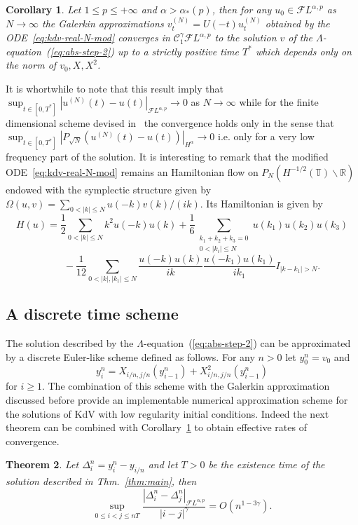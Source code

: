 \documentclass[a4paper,11pt,reqno]{article}
\newcommand{\RR}{\mathbb{R}}
\newcommand{\TT}{\mathbb{T}}
\newcommand{\CC}{\mathcal{C}}
\newcommand{\FF}{\mathcal{F}}
\newtheorem{theorem}{Theorem}
\newtheorem{corollary}[theorem]{Corollary}
\begin{document}
\begin{corollary}
\label{cor:galerkin} Let $1 \le p \le +\infty$ and $\alpha > \alpha_*(p)$, then for any $u_0 \in \FF L^{\alpha,p}$
as $N \to \infty$ the Galerkin approximations $v^{(N)}_t = U(-t) u^{(N)}_t$ obtained by the ODE~\eqref{eq:kdv-real-N-mod}  converges in $\CC_1^\gamma  \FF L^{\alpha,p}$ to
the solution $v$ of the $\Lambda$-equation~(\ref{eq:abs-step-2}) up to
a strictly positive time $T^*$ which depends only on the norm of
$v_0,X,X^2$.  
\end{corollary}
%
It is whortwhile to note that this result imply that
$
\sup_{t\in [0,T^*]} |u^{(N)}(t) - u(t)|_{\FF L^{\alpha,p}}  \to 0
$
as $N \to \infty$ while for the finite dimensional scheme devised in~\cite{MR2233689} the convergence holds only in the sense that
$
\sup_{t\in [0,T^*]} |P_{\sqrt N }(u^{(N)}(t) - u(t))|_{H^{\alpha}}  \to 0
$
i.e. only for a very low frequency part of the solution.
It is interesting to remark that the modified ODE~\eqref{eq:kdv-real-N-mod} remains an Hamiltonian flow on $P_N (H^{-1/2}(\TT)\backslash \RR)$ endowed with the
symplectic structure given by
$
\Omega(u,v) = \sum_{0 < |k| \le N} u(-k) v(k)/(ik)
$. Its Hamiltonian is given by
$$
H(u) = \frac 1 2 \sum_{0< |k| \le N}k^2 u(-k) u(k) + \frac 1 6\sum_{\substack{k_1+k_2+k_3=0\\ 0 < |k_i| \le N}} u(k_1) u(k_2) u(k_3)
$$
$$\qquad - \frac 1 {12} \sum_{0< |k|,|k_1| \le N}  \frac{u(-k) u(k)}{ik} \frac{u(-k_1) u(k_1)}{i k_1}  I_{|k-k_1|>N} .
$$

\subsection{A discrete time scheme}
\label{sec:euler}
The solution described by the
$\Lambda$-equation~(\ref{eq:abs-step-2}) can be approximated
by a discrete Euler-like scheme defined as follows. For any $n >0$ let $y^n_0=v_0$
and 
$$
y^n_i = X_{i/n, j/n}(y^n_{i-1}) +  X^2_{i/n, j/n}(y^n_{i-1})
$$
for $i\ge 1$. 
The combination of  this scheme with the Galerkin approximation
discussed before provide an implementable numerical  approximation scheme for the
solutions of KdV with low regularity initial conditions. Indeed the next theorem  can  be combined with
Corollary~\ref{cor:galerkin} to obtain effective rates of convergence.

\begin{theorem}
Let $\Delta^n_i = y^n_i-y_{i/n}$ and let $T>0$ be the existence time of the
solution described in Thm.~\ref{thm:main}, then
\begin{equation}
  \label{eq:euler-bound}
\sup_{0\le i< j\le nT} \frac{|\Delta^n_i-\Delta^n_j|_{\FF L^{\alpha,p}}}{|i-j|^\gamma} = O(n^{1-3\gamma}) . 
\end{equation}
\end{theorem}
\end{document}
